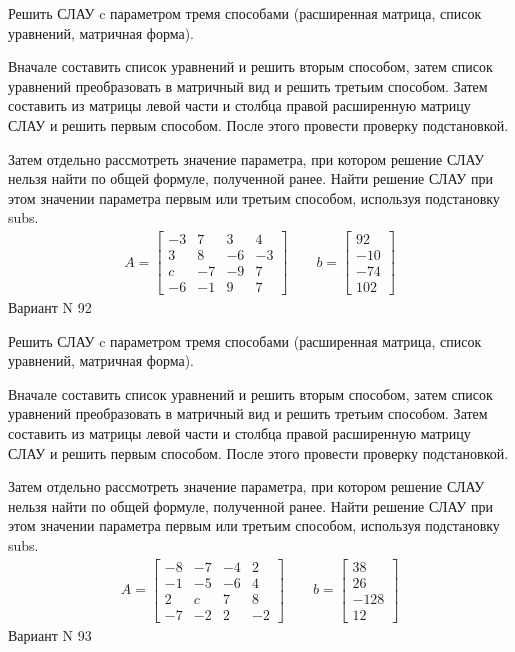 \documentclass[11pt]{report}
\begin{document}
Решить СЛАУ c параметром тремя способами (расширенная матрица, список уравнений, матричная форма).

Вначале составить список уравнений и решить вторым способом,
затем список уравнений преобразовать в матричный вид и решить третьим способом.
Затем составить из матрицы левой части и столбца правой расширенную матрицу СЛАУ и решить первым способом.
После этого провести проверку подстановкой.

Затем отдельно рассмотреть значение параметра, при котором решение СЛАУ нельзя найти по общей формуле,
полученной ранее.
Найти решение СЛАУ при этом значении параметра первым или третьим способом, используя подстановку subs.
\begin{align*}
    A = \left[\begin{matrix}-3 & 7 & 3 & 4\\3 & 8 & -6 & -3\\c & -7 & -9 & 7\\-6 & -1 & 9 & 7\end{matrix}\right]
\qquad b = \left[\begin{matrix}92\\-10\\-74\\102\end{matrix}\right]
\end{align*}
\newpage
Вариант N 92


Решить СЛАУ c параметром тремя способами (расширенная матрица, список уравнений, матричная форма).

Вначале составить список уравнений и решить вторым способом,
затем список уравнений преобразовать в матричный вид и решить третьим способом.
Затем составить из матрицы левой части и столбца правой расширенную матрицу СЛАУ и решить первым способом.
После этого провести проверку подстановкой.

Затем отдельно рассмотреть значение параметра, при котором решение СЛАУ нельзя найти по общей формуле,
полученной ранее.
Найти решение СЛАУ при этом значении параметра первым или третьим способом, используя подстановку subs.
\begin{align*}
    A = \left[\begin{matrix}-8 & -7 & -4 & 2\\-1 & -5 & -6 & 4\\2 & c & 7 & 8\\-7 & -2 & 2 & -2\end{matrix}\right]
\qquad b = \left[\begin{matrix}38\\26\\-128\\12\end{matrix}\right]
\end{align*}
\newpage
Вариант N 93
\end{document}
